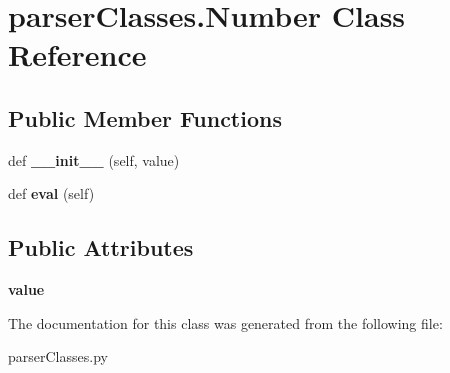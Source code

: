 \hypertarget{classparser_classes_1_1_number}{}\section{parser\+Classes.\+Number Class Reference}
\label{classparser_classes_1_1_number}
\subsection*{Public Member Functions}
\begin{DoxyCompactItemize}
\item 
\mbox{\label{classparser_classes_1_1_number_a556755d9d147b3264b9bf21915166ca1}} 
def {\bfseries \+\_\+\+\_\+init\+\_\+\+\_\+} (self, value)
\item 
\mbox{\label{classparser_classes_1_1_number_ae310cf63d3a1f2e2767189633be8f5ba}} 
def {\bfseries eval} (self)
\end{DoxyCompactItemize}
\subsection*{Public Attributes}
\begin{DoxyCompactItemize}
\item 
\mbox{\label{classparser_classes_1_1_number_ae074c9227b38acb758a77d2f28d644bd}} 
{\bfseries value}
\end{DoxyCompactItemize}


The documentation for this class was generated from the following file\+:\begin{DoxyCompactItemize}
\item 
parser\+Classes.\+py\end{DoxyCompactItemize}

